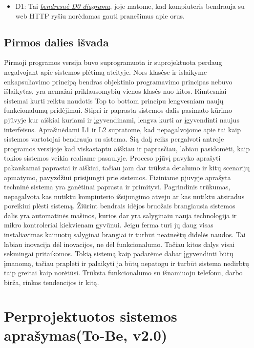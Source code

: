 \documentclass[oneside]{VUMIFPSkursinis}
\begin{document}
	\begin{itemize}
		\item D1: Tai \hyperref[fig:Deployment0]{\textit{bendresnė D0 diagrama}}, joje matome, kad kompiuteris bendrauja su web HTTP ryšiu norėdamas gauti pranešimus apie orus.
	\end{itemize}

\subsection{Pirmos dalies išvada}
Pirmoji programos versija buvo suprogramuota ir suprojektuota perdaug negalvojant apie sistemos plėtimą ateityje. Nors klasėse ir islaikyme enkapsuliavimo principą bendras objektinio programavimo principas nebuvo išlaikytas, yra nemažai priklausomybių vienos klasės nuo kitos. Rimtesniai sistemai kurti reiktu naudotis Top to bottom principu lengvesniam naujų funkcionalumų pridėjimui. Stipri ir paprasta sistemos dalis pasimato kūrimo pjūvyje kur aiškiai kuriami ir įgyvendinami, lengva kurti ar įgyvendinti naujus interfeisus. Aprašinėdami L1 ir L2 supratome, kad nepagalvojome apie tai kaip sistemos vartotojai bendrauja su sistema. Šią dalį reiks pergalvoti antroje programos versijoje kad viskastaptu aiškiau ir paprasčiau, labiau pasidomėti, kaip tokios sistemos veikia realiame pasaulyje. Proceso pjūvį pavyko aprašyti pakankamai paprastai ir aiškiai, tačiau jam dar trūksta detalumo ir kitų scenarijų apmatymo, pavyzdžiui prisijungti prie sistemos. Fiziniame pjūvyje aprašyta techninė sistema yra ganėtinai paprasta ir primityvi. Pagrindinis trūkumas, nepagalvota kas nutiktu kompiuterio išsijungimo atveju ar kas nutiktu atsiradus poreikiui plėsti sistemą. Žiūrint bendrais idėjos bruožais brangiausia sistemos dalis yra automatinės mašinos, kurios dar yra salyginaiu nauja technologija ir mikro kontroleriai kiekvienam gyvūnui. Jeigu ferma turi jų daug visas instaliavimas kainuotų salyginai brangiai ir turbūt neatneštų didelės naudos. Tai labiau inovacija dėl inovacijos, ne dėl funkcionalumo. Tačiau kitos dalys visai sekmingai pritaikomos. Tokią sistemą kaip padarėme dabar įgyvendinti būtų įmanomą, tačiau praplėti ir palaikyti ja būtų nepatogu ir turbūt sistema nedirbtų taip greitai kaip norėtūsi. Trūksta funkcionalumo su išnamiuoju telefonu, darbo birža, rinkos tendencijos ir kitą. 

\pagebreak

\section{Perprojektuotos sistemos aprašymas(To-Be, v2.0)}
\end{document}
